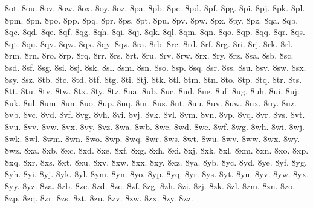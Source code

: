 {8ot.
8ou.
8ov.
8ow.
8ox.
8oy.
8oz.
8pa.
8pb.
8pc.
8pd.
8pf.
8pg.
8pi.
8pj.
8pk.
8pl.
8pm.
8pn.
8po.
8pp.
8pq.
8pr.
8ps.
8pt.
8pu.
8pv.
8pw.
8px.
8py.
8pz.
8qa.
8qb.
8qc.
8qd.
8qe.
8qf.
8qg.
8qh.
8qi.
8qj.
8qk.
8ql.
8qm.
8qn.
8qo.
8qp.
8qq.
8qr.
8qs.
8qt.
8qu.
8qv.
8qw.
8qx.
8qy.
8qz.
8ra.
8rb.
8rc.
8rd.
8rf.
8rg.
8ri.
8rj.
8rk.
8rl.
8rm.
8rn.
8ro.
8rp.
8rq.
8rr.
8rs.
8rt.
8ru.
8rv.
8rw.
8rx.
8ry.
8rz.
8sa.
8sb.
8sc.
8sd.
8sf.
8sg.
8si.
8sj.
8sk.
8sl.
8sm.
8sn.
8so.
8sp.
8sq.
8sr.
8ss.
8su.
8sv.
8sw.
8sx.
8sy.
8sz.
8tb.
8tc.
8td.
8tf.
8tg.
8ti.
8tj.
8tk.
8tl.
8tm.
8tn.
8to.
8tp.
8tq.
8tr.
8ts.
8tt.
8tu.
8tv.
8tw.
8tx.
8ty.
8tz.
8ua.
8ub.
8uc.
8ud.
8ue.
8uf.
8ug.
8uh.
8ui.
8uj.
8uk.
8ul.
8um.
8un.
8uo.
8up.
8uq.
8ur.
8us.
8ut.
8uu.
8uv.
8uw.
8ux.
8uy.
8uz.
8vb.
8vc.
8vd.
8vf.
8vg.
8vh.
8vi.
8vj.
8vk.
8vl.
8vm.
8vn.
8vp.
8vq.
8vr.
8vs.
8vt.
8vu.
8vv.
8vw.
8vx.
8vy.
8vz.
8wa.
8wb.
8wc.
8wd.
8we.
8wf.
8wg.
8wh.
8wi.
8wj.
8wk.
8wl.
8wm.
8wn.
8wo.
8wp.
8wq.
8wr.
8ws.
8wt.
8wu.
8wv.
8ww.
8wx.
8wy.
8wz.
8xa.
8xb.
8xc.
8xd.
8xe.
8xf.
8xg.
8xh.
8xi.
8xj.
8xk.
8xl.
8xm.
8xn.
8xo.
8xp.
8xq.
8xr.
8xs.
8xt.
8xu.
8xv.
8xw.
8xx.
8xy.
8xz.
8ya.
8yb.
8yc.
8yd.
8ye.
8yf.
8yg.
8yh.
8yi.
8yj.
8yk.
8yl.
8ym.
8yn.
8yo.
8yp.
8yq.
8yr.
8ys.
8yt.
8yu.
8yv.
8yw.
8yx.
8yy.
8yz.
8za.
8zb.
8zc.
8zd.
8ze.
8zf.
8zg.
8zh.
8zi.
8zj.
8zk.
8zl.
8zm.
8zn.
8zo.
8zp.
8zq.
8zr.
8zs.
8zt.
8zu.
8zv.
8zw.
8zx.
8zy.
8zz.
}
